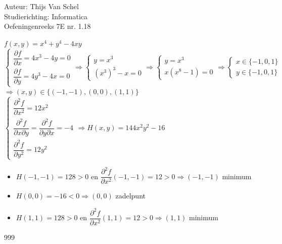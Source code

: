 \documentclass[a4paper]{article}
\begin{document}
  
\noindent \large Auteur: Thijs Van Schel \\
\noindent \large Studierichting: Informatica\\
\noindent \large Oefeningenreeks 7E nr. 1.18\\

\medskip

\normalsize

$f(x,y) = x^4 + y^4 - 4xy$ \\

$
\left\{ 
\begin{array}{l} 
\dfrac{\partial f}{\partial x} = 4x^3 - 4y = 0 \\ 
\dfrac{\partial f}{\partial y} = 4y^3 - 4x = 0 
\end{array} 
\right.
\Rightarrow
\left\{ 
\begin{array}{l} 
y = x^3 \\ 
(x^3)^3 - x = 0 
\end{array} 
\right.
\Rightarrow
\left\{ 
\begin{array}{l} 
y = x^3 \\ 
x(x^8 - 1) = 0 
\end{array} 
\right.
\Rightarrow
\left\{ 
\begin{array}{l} 
x \in \{-1, 0, 1\} \\ 
y \in \{-1, 0, 1\}
\end{array} 
\right.
$ \\

$\Rightarrow (x,y) \in \{(-1, -1), (0, 0), (1, 1)\}$ \\

$
\left\{ 
\begin{array}{l} 
\dfrac{\partial^2 f}{\partial x^2} = 12x^2 \\ 
\dfrac{\partial^2 f}{\partial x \partial y} = \dfrac{\partial^2 f}{\partial y \partial x} = -4 \\
\dfrac{\partial^2 f}{\partial y^2} = 12y^2
\end{array} 
\right.
\Rightarrow H(x,y) = 144x^2y^2 - 16
$ \\

\begin{itemize}
    \item $H(-1, -1) = 128 > 0 \text{ en } \dfrac{\partial^2 f}{\partial x^2}(-1, -1) = 12 > 0 \Rightarrow (-1, -1)$ minimum
    \item $H(0, 0) = -16 < 0 \Rightarrow (0, 0)$ zadelpunt
    \item $H(1, 1) = 128 > 0 \text{ en } \dfrac{\partial^2 f}{\partial x^2}(1, 1) = 12 > 0 \Rightarrow (1, 1)$ minimum
\end{itemize}

\begin{thebibliography}{999}
\end{thebibliography}
\end{document}
